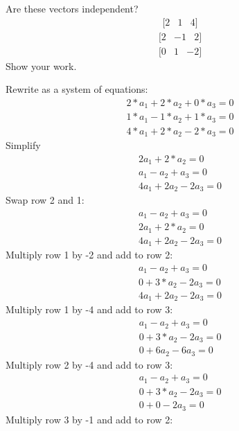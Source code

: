 \begin{Exercise}[title={Vector Independence}, label=vector_independence]
    Are these vectors independent? 
$$\begin{matrix}[2 & 1  & 4]\end{matrix}$$
$$\begin{matrix}[2  & -1  & 2]\end{matrix}$$ 
$$\begin{matrix}[0  & 1  & -2]\end{matrix}$$
Show your work.
\end{Exercise}

\begin{Answer}[ref=vector_independence]
    Rewrite as a system of equations:
        $$\begin{matrix}
			2*a_1 +2*a_2 + 0*a_3 = 0 \\
			1*a_1 - 1*a_2 + 1*a_3 = 0 \\
			4*a_1 + 2*a_2 - 2*a_3 = 0
		  \end{matrix} $$
	Simplify
		$$\begin{matrix}
			2a_1 +2*a_2 = 0 \\
			a_1 - a_2 + a_3 = 0 \\
			4a_1 + 2a_2 - 2a_3 = 0
		  \end{matrix} $$
	Swap row 2 and 1:
		$$\begin{matrix}
			a_1 - a_2 + a_3 = 0 \\
			2a_1 + 2*a_2 = 0 \\
			4a_1 + 2a_2 - 2a_3 = 0
		  \end{matrix} $$
	Multiply row 1 by -2 and add to row 2:
	   $$\begin{matrix}
			a_1 - a_2 + a_3 = 0 \\
			0 +  3*a_2 - 2a_3  = 0 \\
			4a_1 + 2a_2 - 2a_3 = 0
		  \end{matrix} $$
	Multiply row 1 by -4 and add to row 3:	
	    $$\begin{matrix}
			a_1 - a_2 + a_3 = 0 \\
			0 + 3*a_2 -2a_3 = 0 \\
			0 + 6a_2 - 6a_3 = 0
		  \end{matrix} $$
	Multiply row 2 by -4 and add to row 3:
	   $$\begin{matrix}
			a_1 - a_2 + a_3 = 0 \\
			0 + 3*a_2 -2a_3 = 0 \\
			0 + 0 - 2a_3 = 0
		  \end{matrix} $$
	Multiply row 3 by -1 and add to row 2:

\end{Answer}

